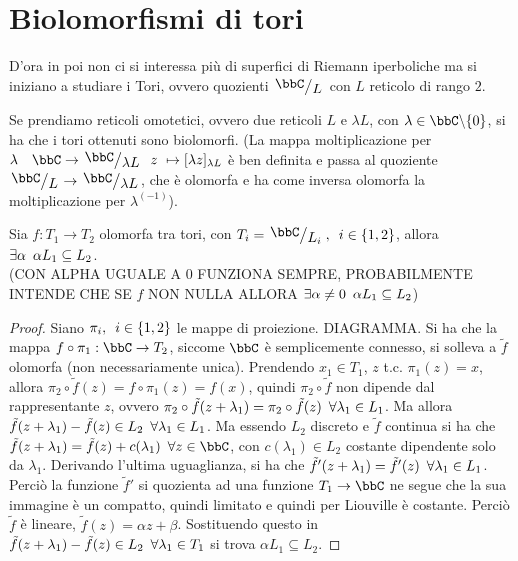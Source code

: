 \section{Biolomorfismi di tori}
D'ora in poi non ci si interessa più di superfici di Riemann iperboliche ma si iniziano a studiare i Tori, ovvero quozienti $\quotient{\bbC}{L}$ con $L$ reticolo di rango $2$.


\begin{osservazione}
Se prendiamo reticoli omotetici, ovvero due reticoli $L$ e $\lambda L$, con $\lambda \in \bbC\minus\{ 0\}$, si ha che i tori ottenuti sono biolomorfi. (La mappa moltiplicazione per $\lambda \quad \bbC \rightarrow \quotient{\bbC}{\lambda L} \hquad z\ \mapsto [\lambda z]_{\lambda L} $ è ben definita e passa al quoziente $\quotient{\bbC}{L}\rightarrow \quotient{\bbC}{\lambda L}$, che è olomorfa e ha come inversa olomorfa la moltiplicazione per $\lambda^{(-1)}$).
\end{osservazione}

\begin{fatto}Sia $f:T_1\rightarrow T_2$ olomorfa tra tori, con $T_i=\quotient{\bbC}{L_i},\hquad i\in \{ 1,2\}$, allora $\exists\alpha \hskip0.5em\relax \alpha L_1\subseteq L_2$.\\
(CON ALPHA UGUALE A $0$ FUNZIONA SEMPRE, PROBABILMENTE INTENDE CHE SE $f$ NON NULLA ALLORA $\exists \alpha \ne 0 \hskip0.5em\relax \alpha L_1\subseteq L_2$)
\end{fatto}
\begin{proof} Siano $\pi_i,\hskip0.5em\relax i\in \{ 1,2\}$ le mappe di proiezione. DIAGRAMMA.
Si ha che la mappa $f\circ\pi_1: \bbC\rightarrow T_2$, siccome $\bbC$ è semplicemente connesso, si solleva a $\tilde{f}$ olomorfa (non necessariamente unica).
Prendendo $x_1\in T_1$, $z$ t.c. $\pi_1(z)=x$, allora $\pi_2\circ\tilde{f} (z) = f\circ \pi_1 (z)= f(x)$, quindi $\pi_2\circ \tilde{f}$ non dipende dal rappresentante $z$, ovvero $\pi_2\circ \tilde{f} (z+\lambda_1)=\pi_2\circ \tilde{f} (z)\hskip0.5em\relax \forall \lambda_1\in L_1$.
Ma allora $\tilde{f} (z+\lambda_1) - \tilde{f} (z) \in L_2 \hskip0.5em\relax \forall \lambda_1 \in L_1$.
Ma essendo $L_2$ discreto e $\tilde{f}$ continua si ha che $\tilde{f}(z+\lambda_1)=\tilde{f}(z)+c(\lambda_1)\hquad \forall z\in\bbC$, con $c(\lambda_1)\in L_2$ costante dipendente solo da $\lambda_1$.
Derivando l'ultima uguaglianza, si ha che $\tilde{f}'(z+\lambda_1)=\tilde{f}'(z) \hskip0.5em\relax\forall \lambda_1\in L_1$.
Perciò la funzione $\tilde{f}'$ si quozienta ad una funzione  $T_1\rightarrow \bbC$ ne segue che la sua immagine è un compatto, quindi limitato e quindi per Liouville è costante. 
Perciò $\tilde{f}$ è lineare, $\tilde{f}(z)=\alpha z+\beta$.
Sostituendo questo in $\tilde{f} (z+\lambda_1) - \tilde{f} (z) \in L_2 \hskip0.5em\relax \forall \lambda_1 \in T_1$ si trova $\alpha L_1\subseteq L_2$.
\end{proof}

